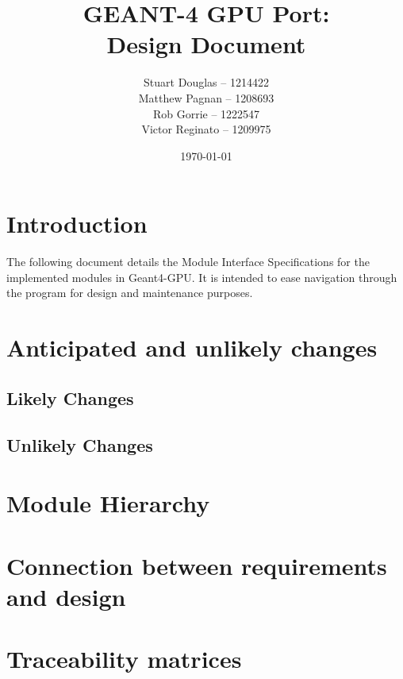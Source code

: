 \documentclass[12pt]{article}
\begin{document}
\title{
\LARGE GEANT-4 GPU Port:
\\\vspace{10mm}
\large \textbf{Design Document}
\vspace{20mm}
}
\author{
Stuart Douglas -- 1214422
\\Matthew Pagnan -- 1208693
\\Rob Gorrie -- 1222547
\\Victor Reginato -- 1209975
\vspace{10mm}
}
\date{\today}
	
\maketitle
\newpage

\tableofcontents
 
\section{Introduction}%
The following document details the Module Interface Specifications for the implemented modules in Geant4-GPU. It is intended to ease navigation through the program for design and maintenance purposes.\\


\section{Anticipated and unlikely changes}
\subsection{Likely Changes} %
\subsection{Unlikely Changes} %

\section{Module Hierarchy}%

\section{Connection between requirements and design}%

\section{Traceability matrices}%
\end{document}
